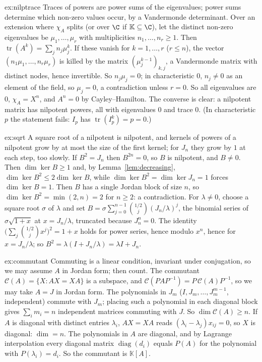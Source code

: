 \begin{solution}{ex:nilptrace}
\idea Traces of powers are power sums of the eigenvalues; power sums determine which non-zero values occur, by a
Vandermonde determinant.
\writeup Over an extension where $\chi_A$ splits (or over $\C$ if $\mathbb K\subseteq\C$), let the distinct non-zero eigenvalues
be $\mu_1,\dots,\mu_r$ with multiplicities $n_1,\dots,n_r\ge1$. Then $\operatorname{tr}(A^k)=\sum_jn_j\mu_j^k$. If these vanish for
$k=1,\dots,r$ ($r\le n$), the vector $(n_1\mu_1,\dots,n_r\mu_r)$ is killed by the matrix $(\mu_j^{k-1})_{k,j}$, a Vandermonde matrix
with distinct nodes, hence invertible. So $n_j\mu_j=0$; in characteristic $0$, $n_j\ne0$ as an element of the field, so
$\mu_j=0$, a contradiction unless $r=0$. So all eigenvalues are $0$, $\chi_A=X^n$, and $A^n=0$ by Cayley--Hamilton. The
converse is clear: a nilpotent matrix has nilpotent powers, all with eigenvalues $0$ and trace $0$. (In characteristic
$p$ the statement fails: $I_p$ has $\operatorname{tr}(I_p^k)=p=0$.)
\end{solution}

\begin{solution}{ex:sqrt}
\idea A square root of a nilpotent is nilpotent, and kernels of powers of a nilpotent grow by at most the size of the
first kernel; for $J_n$ they grow by $1$ at each step, too slowly.
\writeup If $B^2=J_n$ then $B^{2n}=0$, so $B$ is nilpotent, and $B\ne0$. Then $\dim\ker B\ge1$ and, by
Lemma~\ref{lem:decreasing}, $\dim\ker B^2\le2\dim\ker B$, while $\dim\ker B^2=\dim\ker J_n=1$ forces $\dim\ker B=1$. Then
$B$ has a single Jordan block of size $n$, so $\dim\ker B^2=\min(2,n)=2$ for $n\ge2$: a contradiction. For $\lambda\ne0$,
choose a square root $\sigma$ of $\lambda$ and set $B=\sigma\sum_{j=0}^{n-1}\binom{1/2}{j}(J_n/\lambda)^j$, the binomial series of
$\sigma\sqrt{1+x}$ at $x=J_n/\lambda$, truncated because $J_n^n=0$. The identity $\bigl(\sum_j\binom{1/2}jx^j\bigr)^2=1+x$ holds for
power series, hence modulo $x^n$, hence for $x=J_n/\lambda$; so $B^2=\lambda(I+J_n/\lambda)=\lambda I+J_n$.
\end{solution}

\begin{solution}{ex:commutant}
\idea Commuting is a linear condition, invariant under conjugation, so we may assume $A$ in Jordan form; then count.
\writeup The commutant $\mathcal C(A)=\{X:AX=XA\}$ is a subspace, and $\mathcal C(PAP^{-1})=P\,\mathcal C(A)P^{-1}$, so we may take $A=J$
in Jordan form. The polynomials in $J_m$ ($I,J_m,\dots,J_m^{m-1}$, independent) commute with $J_m$; placing such a polynomial
in each diagonal block gives $\sum_im_i=n$ independent matrices commuting with $J$. So $\dim\mathcal C(A)\ge n$. If $A$ is
diagonal with distinct entries $\lambda_i$, $AX=XA$ reads $(\lambda_i-\lambda_j)x_{ij}=0$, so $X$ is diagonal: $\dim=n$. The
polynomials in $A$ are diagonal, and by Lagrange interpolation every diagonal matrix $\operatorname{diag}(d_i)$ equals
$P(A)$ for the polynomial with $P(\lambda_i)=d_i$. So the commutant is $\mathbb K[A]$.
\end{solution}


